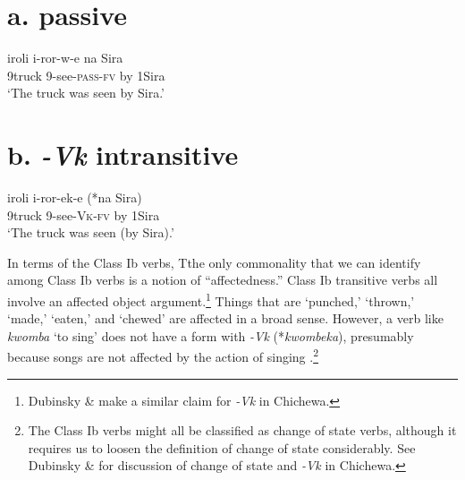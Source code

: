\documentclass[output=paper]{langsci/langscibook}
\begin{document}
\begin{styleTabellenberschrift}
\begin{styleTabellenberschrift}
\chapter[a. passive]{a. \textbf{passive}}
\gll iroli      i-ror-w-e         na Sira\\
     9truck  9-see-\textsc{pass-fv} by 1Sira\\
\glt ‘The truck was seen by Sira.’ 
\z

\chapter[b. {}-Vk intransitive]{b. \textbf{\textit{{}-Vk}}\textbf{ intransitive}}
\gll iroli    i-ror-ek-e       (*na Sira)\\
     9truck 9-see-\textsc{Vk}\textsc{{}-}\textsc{fv}   by 1Sira\\
\glt ‘The truck was seen (by Sira).’
\z

In terms of the Class Ib verbs, Tthe only commonality that we can identify among Class Ib verbs is a notion of “affectedness.” Class Ib transitive verbs all involve an affected object argument.\footnote{ Dubinsky \& \citet{Simango1996} make a similar claim for \textit{{}-Vk} in Chichewa.} Things that are ‘punched,’ ‘thrown,’ ‘made,’ ‘eaten,’ and ‘chewed’ are affected in a broad sense. However, a verb like \textit{kwomba} ‘to sing’ does not have a form with \textit{{}-Vk} (*\textit{kwombeka}), presumably because songs are not affected by the action of singing%
%
%
%
%
%
%
.\footnote{ The Class Ib verbs might all be classified as change of state verbs, although it requires us to loosen the definition of change of state considerably. See Dubinsky \& \citet{Simango1996} for discussion of change of state and \textit{{}-Vk} in Chichewa.}


\end{styleTabellenberschrift}
\end{styleTabellenberschrift}
\end{document}
